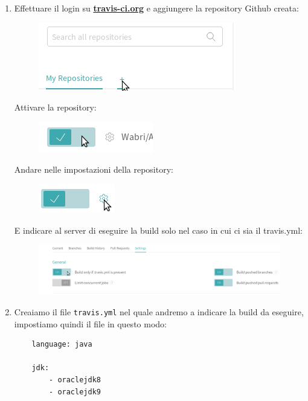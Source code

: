 \begin{enumerate}
\begin{figure}[H]
    \end{figure}
    \item Effettuare il login su \textbf{\href{https://travis-ci.org}{travis-ci.org}} e aggiungere la repository Github creata:
    \begin{figure}[H]
        \centering
        \includegraphics{4IntegrationWithOtherTool/tutorial/newTravis.png}
    \end{figure}
    Attivare la repository:
    \begin{figure}[H]
        \centering
        \includegraphics{4IntegrationWithOtherTool/tutorial/spuntaTravis.png}
    \end{figure}
    Andare nelle impostazioni della repository:
    \begin{figure}[H]
    \centering
    \includegraphics{4IntegrationWithOtherTool/tutorial/settingsTravis.png}
    \end{figure}
    E indicare al server di eseguire la build solo nel caso in cui ci sia il travis.yml:
    \begin{figure}[H]
    \centering
    \includegraphics[width=0.7\linewidth]{4IntegrationWithOtherTool/tutorial/buildOnlyTravis.png}
    \end{figure}
    \item Creaiamo il file \texttt{travis.yml} nel quale andremo a indicare la build da eseguire, impostiamo quindi il file in questo modo:
    \begin{verbatim}
    language: java

    jdk:
        - oraclejdk8
        - oraclejdk9


\end{verbatim}
\end{enumerate}
